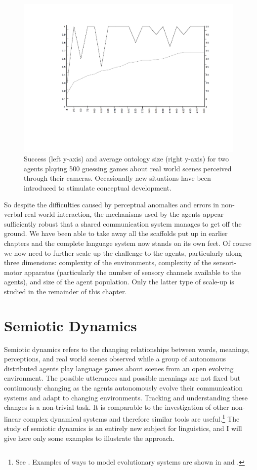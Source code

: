 \begin{figure}[htbp]
  \centerline{\includegraphics[width=.70\textwidth]{chap7/figs/psucc500}}
\caption{\label{psuccess1} Success 
(left y-axis) and average ontology size
(right y-axis) for two agents playing 500
guessing games about real world scenes perceived
through their cameras. Occasionally new situations
have been introduced to stimulate conceptual development.} 
\end{figure}

So despite the difficulties caused by perceptual anomalies
and errors in non-verbal real-world interaction, the 
mechanisms used by the agents appear sufficiently 
robust that a shared communication system manages to get 
off the ground. We have been able to 
take away all the scaffolds put up in earlier
chapters and the complete language system now stands on its own
feet. Of course we now need to further scale up the 
challenge to the agents, particularly along three
dimensions: complexity of the environments, complexity 
of the sensori-motor apparatus (particularly the number of
sensory channels available to the agents), and
size of the agent population. Only the latter type of 
scale-up is studied in the remainder of this chapter. 

\section{Semiotic Dynamics} 

Semiotic dynamics refers to the changing relationships
between words, meanings, perceptions,
and real world scenes observed while a group of
autonomous distributed agents play language games
about scenes from an open evolving environment. 
The possible utterances and
possible meanings are not fixed but continuously
changing as the agents autonomously evolve their
communication systems and adapt to changing
environments. Tracking and understanding these
changes is a non-trivial task. It is comparable to 
the investigation of other non-linear complex dynamical
systems and therefore similar tools are useful.\footnote{
See \cite{Badii:1997}. 
Examples of ways to model evolutionary systems are shown in 
\cite{Kauffman:1993} and \cite{Maynard:1989}.}
The study of semiotic dynamics is an entirely new subject
for linguistics, and I will give here only some
examples to illustrate the approach. 

